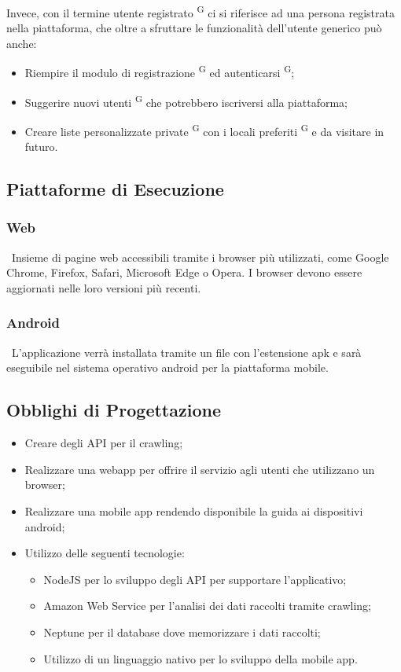 Invece, con il termine utente registrato \textsuperscript{G} ci si riferisce ad una persona registrata nella piattaforma, che oltre a sfruttare le funzionalità dell’utente generico può anche:

\begin{itemize}
  \item Riempire il modulo di registrazione \textsuperscript{G} ed autenticarsi \textsuperscript{G};
  \item Suggerire nuovi utenti \textsuperscript{G} che potrebbero iscriversi alla piattaforma;
  \item Creare liste personalizzate private \textsuperscript{G} con i locali preferiti \textsuperscript{G} e da visitare in futuro.
\end{itemize}

\subsection{Piattaforme di Esecuzione}

\subsubsection{Web} \ 
Insieme di pagine web accessibili tramite i browser più utilizzati, come Google Chrome, Firefox, Safari, Microsoft Edge o Opera. I browser devono essere aggiornati nelle loro versioni più recenti.

\subsubsection{Android} \ 
L'applicazione verrà installata tramite un file con l’estensione apk e sarà eseguibile nel sistema operativo android per la piattaforma mobile.

\subsection{Obblighi di Progettazione}
\begin{itemize}
  \item Creare degli API per il crawling;
  \item Realizzare una webapp per offrire il servizio agli utenti che utilizzano un browser;
  \item Realizzare una mobile app rendendo disponibile la guida ai dispositivi android;
  \item Utilizzo delle seguenti tecnologie: \begin{itemize}
    \item NodeJS per lo sviluppo degli API per supportare l’applicativo;
    \item Amazon Web Service per l'analisi dei dati raccolti tramite crawling;
    \item Neptune per il database dove memorizzare i dati raccolti;
    \item Utilizzo di un linguaggio nativo per lo sviluppo della mobile app.
  \end{itemize}

\end{itemize}
